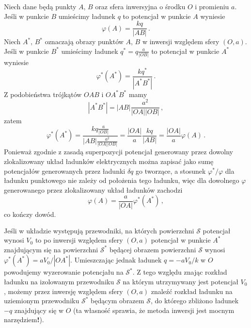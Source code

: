 \documentclass[../main.tex]{subfiles}
\begin{document}
Niech dane będą punkty \(A\), \(B\) oraz sfera inwersyjna o środku \(O\) i promieniu \(a\). Jeśli w
punkcie \(B\) umieścimy ładunek \(q\) to potencjał w punkcie \(A\) wyniesie
\begin{equation*}
    \varphi(A)=\frac{kq}{|AB|}\,.
\end{equation*}
Niech \(A^*\), \(B^*\) oznaczają obrazy punktów \(A\), \(B\) w inwersji względem sfery \((O,a)\).
Jeśli w punkcie \(B^*\) umieścimy ładunek \(q^*=q\frac{a}{|OB|}\) to potencjał w punkcie \(A^*\)
wyniesie
\begin{equation*}
    \varphi^*(A^*)=\frac{kq^*}{|A^*B^*|}\,.
\end{equation*}
Z podobieństwa trójkątów \(OAB\) i \(OA^*B^*\) mamy
\begin{equation*}
    |A^*B^*|=|AB|\frac{a^2}{|OA| |OB|}\,,
\end{equation*}
zatem
\begin{equation*}
    \varphi^*(A^*)=\frac{kq\frac{a}{|OB|}}{|AB|\frac{a^2}{|OA| |OB|}}=\frac{|OA|}{a}\frac{kq}{|AB|}=\frac{|OA|}{a}\varphi(A)\,.
\end{equation*}
Ponieważ zgodnie z zasadą superpozycji potencjał generowany przez dowolny zlokalizowany układ
ładunków elektrycznych można zapisać jako sumę potencjałów generowanych przez ładunki \(\delta q\)
go tworzące, a stosunek \(\varphi^*/\varphi\) dla ładunku punktowego nie zależy od położenia tego
ładunku, więc dla dowolnego \(\varphi\) generowanego przez zlokalizowany układ ładunków zachodzi
\begin{equation*}
            \varphi(A)=\frac{a}{|OA|}\varphi^*(A^*)\,,
\end{equation*}
co kończy dowód.
\medskip

\medskip

Jeśli w układzie występują przewodniki, na których powierzchni \(\mathcal{S}\) potencjał wynosi
\(V_0\) to po inwersji względem sfery \((O,a)\) potencjał w punkcie \(A^*\) znajdującym się na
powierzchni \(\mathcal{S}^*\) będącej obrazem powierzchni \(\mathcal{S}\) wynosi
\(\varphi^*(A^*)=aV_0/|OA^*|\). Umieszczając jednak ładunek \(q=-aV_0/k\) w \(O\) powodujemy
wyzerowanie potencjału na \(\mathcal{S}^*\). Z tego względu znając rozkład ładunku na izolowanym
przewodniku \(\mathcal{S}\) na którym utrzymywany jest potencjał \(V_0\), możemy przez inwersję
względem sfery \((O,a)\) znaleźć rozkład ładunku na uziemionym przewodniku \(\mathcal{S}^*\) będącym
obrazem \(\mathcal{S}\), do którego zbliżono ładunek \(-q\) znajdujący się w \(O\) (ta własność
sprawia, że metoda inwersji jest mocnym narzędziem\textbf{!}).
\end{document}
